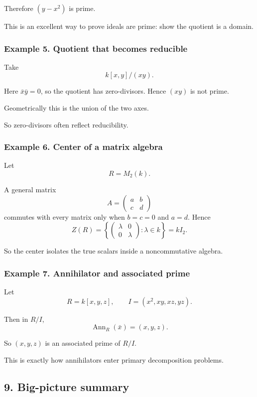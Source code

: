 \documentclass[12pt,a4paper]{article}
\theoremstyle{plain}
\theoremstyle{definition}      %
\begin{document}
	Therefore \((y-x^2)\) is prime.
	
	This is an excellent way to prove ideals are prime: show the quotient is a domain.
	
	\subsubsection*{Example 5. Quotient that becomes reducible}
	
	Take
	\[
	k[x,y]/(xy).
	\]
	
	Here \(\bar x\bar y=0\), so the quotient has zero-divisors. Hence \((xy)\) is not prime.
	
	Geometrically this is the union of the two axes.
	
	So zero-divisors often reflect reducibility.
	
	\subsubsection*{Example 6. Center of a matrix algebra}
	
	Let
	\[
	R=M_2(k).
	\]
	
	A general matrix
	\[
	A=\begin{pmatrix}a&b\\ c&d\end{pmatrix}
	\]
	commutes with every matrix only when \(b=c=0\) and \(a=d\). Hence
	\[
	Z(R)=\left\{
	\begin{pmatrix}
		\lambda&0\\
		0&\lambda
	\end{pmatrix}
	:\lambda\in k
	\right\}=kI_2.
	\]
	
	So the center isolates the true scalars inside a noncommutative algebra.
	
	\subsubsection*{Example 7. Annihilator and associated prime}
	
	Let
	\[
	R=k[x,y,z],\qquad I=(x^2,xy,xz,yz).
	\]
	
	Then in \(R/I\),
	\[
	\operatorname{Ann}_R(\bar x)=(x,y,z).
	\]
	
	So \((x,y,z)\) is an associated prime of \(R/I\).
	
	This is exactly how annihilators enter primary decomposition problems.
	
	\subsection*{9. Big-picture summary}
	
\end{document}
